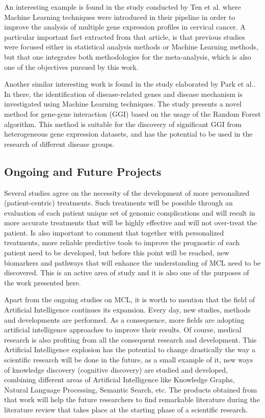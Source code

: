 An interesting example is found in the study conducted by Ten et al.\cite{Tan2018} where Machine Learning techniques were introduced in their pipeline in order to improve the analysis of multiple gene expression profiles in cervical cancer.
A particular important fact extracted from that article, is that previous studies were focused either in statistical analysis methods or Machine Learning methods, but that one integrates both methodologies for the meta-analysis, which is also one of the objectives pursued by this work.

Another similar interesting work is found in the study elaborated by Park et al.\cite{Park2018}. In there, the identification of disease-related genes and disease mechanism is investigated using Machine Learning techniques. The study presents a novel method for gene-gene interaction (GGI) based on the usage of the Random Forest algorithm. This method is suitable for the discovery of significant GGI from heterogeneous gene expression datasets, and has the potential to be used in the research of different disease groups.

\subsection{Ongoing and Future Projects}

Several studies\cite{Inamdar2016}\cite{Steiner2018}\cite{Schieber2018}\cite{Dreyling2016} agree on the necessity of the development of more personalized (patient-centric) treatments. Such treatments will be possible through an evaluation of each patient unique set of genomic complications and will result in more accurate treatments that will be highly effective and will not over-treat the patient. Is also important to comment that together with personalized treatments, more reliable predictive tools to improve the prognostic of each patient need to be developed, but before this point will be reached, new biomarkers and pathways that will enhance the understanding of MCL need to be discovered. This is an active area of study and it is also one of the purposes of the work presented here.

Apart from the ongoing studies on MCL, it is worth to mention that the field of Artificial Intelligence continues its expansion. Every day, new studies, methods and developments are performed. As a consequence, more fields are adopting artificial intelligence approaches to improve their results. Of course, medical research is also profiting from all the consequent research and development.
This Artificial Intelligence explosion has the potential to change drastically the way a scientific research will be done in the future, as a small example of it, new ways of knowledge discovery (cognitive discovery) are studied and developed, combining different areas of Artificial Intelligence like Knowledge Graphs, Natural Language Processing, Semantic Search, etc. The products obtained from that work will help the future researchers to find remarkable literature during the literature review that takes place at the starting phase of a scientific research.\cite{Raymond2019}